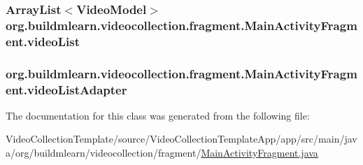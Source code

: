 \subsubsection[{\texorpdfstring{video\+List}{videoList}}]{\setlength{\rightskip}{0pt plus 5cm}Array\+List$<${\bf Video\+Model}$>$ org.\+buildmlearn.\+videocollection.\+fragment.\+Main\+Activity\+Fragment.\+video\+List\hspace{0.3cm}{\ttfamily [private]}}\hypertarget{classorg_1_1buildmlearn_1_1videocollection_1_1fragment_1_1MainActivityFragment_ad698dc8ea0500aab0936c847157d5728}{}\label{classorg_1_1buildmlearn_1_1videocollection_1_1fragment_1_1MainActivityFragment_ad698dc8ea0500aab0936c847157d5728}
\subsubsection[{\texorpdfstring{video\+List\+Adapter}{videoListAdapter}}]{ org.\+buildmlearn.\+videocollection.\+fragment.\+Main\+Activity\+Fragment.\+video\+List\+Adapter\hspace{0.3cm}{\ttfamily [private]}}\hypertarget{classorg_1_1buildmlearn_1_1videocollection_1_1fragment_1_1MainActivityFragment_a35180e3f8baa02ea99ed6aaf6d2f545f}{}\label{classorg_1_1buildmlearn_1_1videocollection_1_1fragment_1_1MainActivityFragment_a35180e3f8baa02ea99ed6aaf6d2f545f}


The documentation for this class was generated from the following file\+:\begin{DoxyCompactItemize}
\item 
Video\+Collection\+Template/source/\+Video\+Collection\+Template\+App/app/src/main/java/org/buildmlearn/videocollection/fragment/\hyperlink{VideoCollectionTemplate_2source_2VideoCollectionTemplateApp_2app_2src_2main_2java_2org_2buildmle5ec78e4cdd65bc5e3b3154db5d4ed40b}{Main\+Activity\+Fragment.\+java}\end{DoxyCompactItemize}
